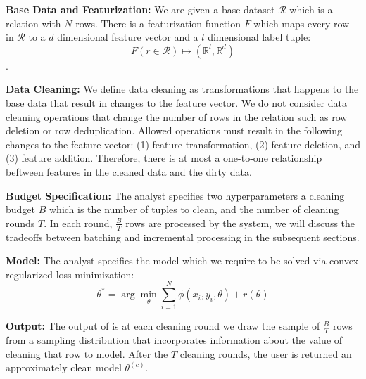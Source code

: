 \noindent\textbf{Base Data and Featurization: } We are given a base dataset $\mathcal{R}$ which is a relation with $N$ rows. There is a featurization function $F$ which maps every row in $\mathcal{R}$ to a $d$ dimensional feature vector and a $l$ dimensional label tuple: \[F(r \in \mathcal{R}) \mapsto (\mathbb{R}^l, \mathbb{R}^d)\]. 

\noindent\textbf{Data Cleaning: } We define data cleaning as transformations that happens to the base data that result in changes to the feature vector. We do not consider data cleaning operations that change the number of rows in the relation such as row deletion or row deduplication. Allowed operations must result in the following changes to the feature vector: (1) feature transformation, (2) feature deletion, and (3) feature addition. Therefore, there is at most a one-to-one relationship beftween features in the cleaned data and the dirty data.


\noindent\textbf{Budget Specification: } The analyst specifies two hyperparameters a cleaning budget $B$ which is the number of tuples to clean, and the number of cleaning rounds $T$. In each round, $\frac{B}{T}$ rows are processed by the system, we will discuss the tradeoffs between batching and incremental processing in the subsequent sections.


\noindent\textbf{Model: } The analyst specifies the model which we require to be solved via convex regularized loss minimization:
\[
 \theta^{*}=\arg\min_{\theta}\sum_{i=1}^{N}\phi(x_{i},y_{i},\theta) + r(\theta)
\]

\noindent\textbf{Output: } The output of \sys is at each cleaning round we draw the sample of $\frac{B}{T}$ rows from a sampling distribution that incorporates information about the value of cleaning that row to model. After the $T$ cleaning rounds, the user is returned an approximately clean model $\theta^{(c)}$.
